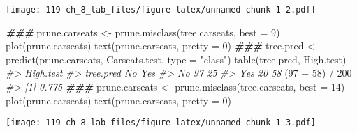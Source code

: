 \documentclass[
]{book}
\newenvironment{Shaded}{\begin{snugshade}}{\end{snugshade}}
\newcommand{\AttributeTok}[1]{\textcolor[rgb]{0.77,0.63,0.00}{#1}}
\newcommand{\CommentTok}[1]{\textcolor[rgb]{0.56,0.35,0.01}{\textit{#1}}}
\newcommand{\DecValTok}[1]{\textcolor[rgb]{0.00,0.00,0.81}{#1}}
\newcommand{\DocumentationTok}[1]{\textcolor[rgb]{0.56,0.35,0.01}{\textbf{\textit{#1}}}}
\newcommand{\FunctionTok}[1]{\textcolor[rgb]{0.00,0.00,0.00}{#1}}
\newcommand{\NormalTok}[1]{#1}
\newcommand{\OtherTok}[1]{\textcolor[rgb]{0.56,0.35,0.01}{#1}}
\newcommand{\SpecialCharTok}[1]{\textcolor[rgb]{0.00,0.00,0.00}{#1}}
\newcommand{\StringTok}[1]{\textcolor[rgb]{0.31,0.60,0.02}{#1}}
\begin{document}
\begin{Shaded}
\end{Shaded}

\texttt{[image: 119-ch\_8\_lab\_files/figure-latex/unnamed-chunk-1-2.pdf]}

\begin{Shaded}
\begin{Highlighting}[]
\DocumentationTok{\#\#\#}
\NormalTok{prune.carseats }\OtherTok{\textless{}{-}} \FunctionTok{prune.misclass}\NormalTok{(tree.carseats, }\AttributeTok{best =} \DecValTok{9}\NormalTok{)}
\FunctionTok{plot}\NormalTok{(prune.carseats)}
\FunctionTok{text}\NormalTok{(prune.carseats, }\AttributeTok{pretty =} \DecValTok{0}\NormalTok{)}
\DocumentationTok{\#\#\#}
\NormalTok{tree.pred }\OtherTok{\textless{}{-}} \FunctionTok{predict}\NormalTok{(prune.carseats, Carseats.test,}
                     \AttributeTok{type =} \StringTok{"class"}\NormalTok{)}
\FunctionTok{table}\NormalTok{(tree.pred, High.test)}
\CommentTok{\#\textgreater{}          High.test}
\CommentTok{\#\textgreater{} tree.pred No Yes}
\CommentTok{\#\textgreater{}       No  97  25}
\CommentTok{\#\textgreater{}       Yes 20  58}
\NormalTok{(}\DecValTok{97} \SpecialCharTok{+} \DecValTok{58}\NormalTok{) }\SpecialCharTok{/} \DecValTok{200}
\CommentTok{\#\textgreater{} [1] 0.775}
\DocumentationTok{\#\#\#}
\NormalTok{prune.carseats }\OtherTok{\textless{}{-}} \FunctionTok{prune.misclass}\NormalTok{(tree.carseats, }\AttributeTok{best =} \DecValTok{14}\NormalTok{)}
\FunctionTok{plot}\NormalTok{(prune.carseats)}
\FunctionTok{text}\NormalTok{(prune.carseats, }\AttributeTok{pretty =} \DecValTok{0}\NormalTok{)}
\end{Highlighting}
\end{Shaded}

\texttt{[image: 119-ch\_8\_lab\_files/figure-latex/unnamed-chunk-1-3.pdf]}
\end{document}
